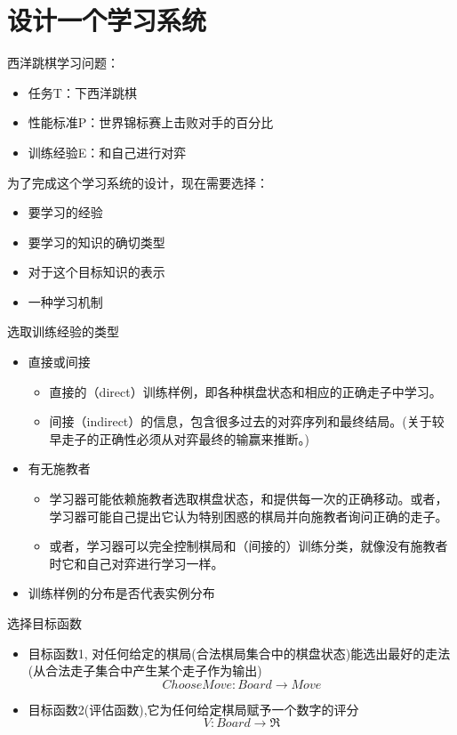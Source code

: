 \documentclass[presentation]{beamer}
\begin{document}
\section{设计一个学习系统}
\label{sec:orgfabda62}

\begin{frame}[label={sec:org7dd3053}]{西洋跳棋学习问题：}
\begin{itemize}
\item 任务T：下西洋跳棋
\item 性能标准P：世界锦标赛上击败对手的百分比
\item 训练经验E：和自己进行对弈
\end{itemize}

为了完成这个学习系统的设计，现在需要选择：
\begin{itemize}
\item 要学习的经验
\item 要学习的知识的确切类型
\item 对于这个目标知识的表示
\item 一种学习机制
\end{itemize}
\end{frame}

\begin{frame}[label={sec:org0d01b6a}]{选取训练经验的类型}
\begin{itemize}
\item 直接或间接
\begin{itemize}
\item 直接的（direct）训练样例，即各种棋盘状态和相应的正确走子中学习。
\item 间接（indirect）的信息，包含很多过去的对弈序列和最终结局。(关于较早走子的正确性必须从对弈最终的输赢来推断。)
\end{itemize}
\item 有无施教者
\begin{itemize}
\item 学习器可能依赖施教者选取棋盘状态，和提供每一次的正确移动。或者，学习器可能自己提出它认为特别困惑的棋局并向施教者询问正确的走子。
\item 或者，学习器可以完全控制棋局和（间接的）训练分类，就像没有施教者时它和自己对弈进行学习一样。
\end{itemize}

\item 训练样例的分布是否代表实例分布
\end{itemize}
\end{frame}

\begin{frame}[label={sec:orgc7ddf0c}]{选择目标函数}
\begin{itemize}
\item 目标函数1, 对任何给定的棋局(合法棋局集合中的棋盘状态)能选出最好的走法(从合法走子集合中产生某个走子作为输出)
$$ChooseMove: Board \rightarrow Move$$
\item 目标函数2(评估函数),它为任何给定棋局赋予一个数字的评分
$$V: Board \rightarrow \Re$$
\end{itemize}
\end{frame}
\end{document}
